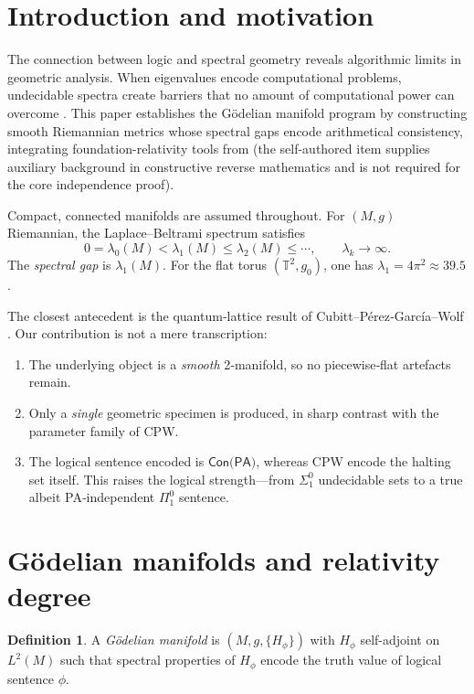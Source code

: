 \documentclass[11pt]{article}
\theoremstyle{definition}\newtheorem{definition}[theorem]{Definition}
\theoremstyle{remark}\newtheorem{remark}[theorem]{Remark}
\begin{document}
\section{Introduction and motivation}
\label{sec:intro}

The connection between logic and spectral geometry reveals algorithmic limits in geometric analysis. When eigenvalues encode computational problems, undecidable spectra create barriers that no amount of computational power can overcome \cite{PourElRichards1989}. This paper establishes the Gödelian manifold program by constructing smooth Riemannian metrics whose spectral gaps encode arithmetical consistency, integrating foundation-relativity tools from \cite{Lee2025Framework} (the self-authored item supplies auxiliary background in constructive reverse mathematics and is not required for the core independence proof).

Compact, connected manifolds are assumed throughout. For $(M,g)$ Riemannian, the Laplace–Beltrami spectrum satisfies
\[
0=\lambda_0(M)<\lambda_1(M)\le\lambda_2(M)\le\cdots,\qquad
\lambda_k\to\infty.
\]
The \emph{spectral gap} is $\lambda_1(M)$. For the flat torus $(\mathbb{T}^2, g_0)$, one has $\lambda_1 = 4\pi^2 \approx 39.5$.

The closest antecedent is the quantum‑lattice result of
Cubitt–Pérez‑García–Wolf \cite{Cubitt2015}.  Our contribution is not a
mere transcription:
\begin{enumerate}[label=\textnormal{(\roman*)}]
  \item The underlying object is a \emph{smooth} 2‑manifold, so no
        piecewise‑flat artefacts remain.
  \item Only a \emph{single} geometric specimen is produced, in sharp
        contrast with the parameter family of CPW.
  \item  The logical sentence encoded is
        $\textsf{Con(PA)}$, whereas CPW encode the halting set itself.
        This raises the logical strength—from $\Sigma^0_1$ undecidable
        sets to a true albeit PA‑independent $\Pi^0_1$ sentence.
\end{enumerate}

\section{Gödelian manifolds and relativity degree}

\begin{definition}
A \emph{Gödelian manifold} is $(M,g,\{H_\phi\})$ with $H_\phi$ self-adjoint on $L^2(M)$ such that spectral properties of $H_\phi$ encode the truth value of logical sentence $\phi$.
\end{definition}
\end{document}
